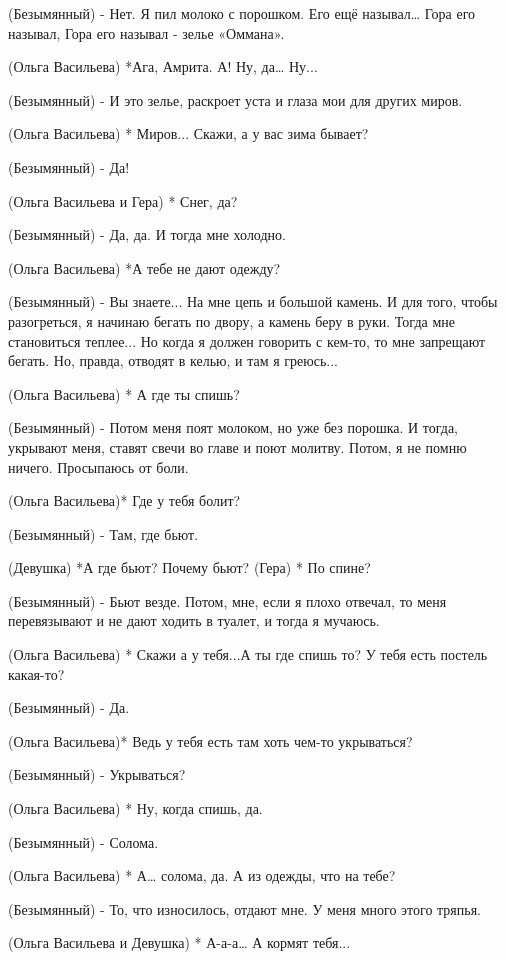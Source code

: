 (Безымянный) - Нет. Я пил молоко с порошком. Его ещё называл… Гора его называл, Гора его называл - зелье «Оммана».

(Ольга Васильева) *Ага, Амрита. А! Ну, да… Ну...

(Безымянный) - И это зелье, раскроет уста и глаза мои  для других миров.

(Ольга Васильева) * Миров... Скажи, а у вас зима бывает?

(Безымянный) - Да!

(Ольга Васильева и Гера) * Снег, да? 

(Безымянный) - Да, да. И тогда мне холодно.

(Ольга Васильева) *А тебе не дают одежду?

(Безымянный) - Вы знаете... На мне цепь и большой камень. И для того, чтобы разогреться, я начинаю бегать по двору, а камень беру в руки. Тогда мне становиться теплее... Но когда я должен говорить с кем-то, то мне запрещают бегать. Но, правда, отводят в келью, и там я греюсь...

(Ольга Васильева) * А где ты спишь?

(Безымянный) - Потом меня поят молоком, но уже без порошка. И тогда, укрывают меня, ставят свечи во главе и поют молитву. Потом, я не помню ничего. Просыпаюсь от боли.

(Ольга Васильева)*  Где у тебя болит?

(Безымянный) - Там, где бьют. 

(Девушка) *А где бьют? Почему бьют?
(Гера) * По спине?

(Безымянный) - Бьют везде. Потом,  мне, если я плохо отвечал, то меня перевязывают и не дают ходить в туалет, и тогда я мучаюсь.

(Ольга Васильева) * Скажи а у тебя...А ты где спишь то? У тебя есть постель какая-то?

(Безымянный) - Да.

(Ольга Васильева)*  Ведь у тебя есть там хоть чем-то укрываться?

(Безымянный) - Укрываться? 

(Ольга Васильева) * Ну, когда спишь, да.

(Безымянный) - Солома.

(Ольга Васильева) * А… солома, да. А из одежды, что на тебе?

(Безымянный) - То, что износилось, отдают мне. У меня много этого тряпья. 

(Ольга Васильева и Девушка) * А-а-а… А кормят тебя...



